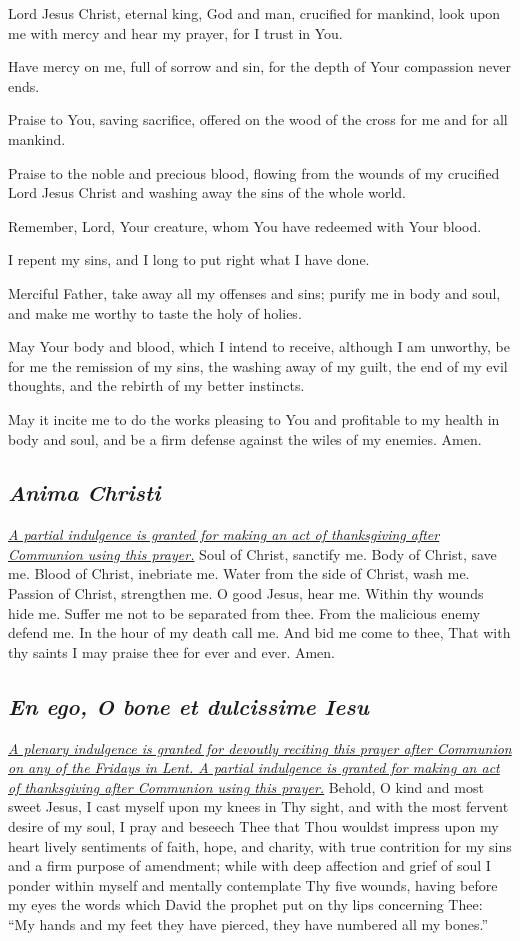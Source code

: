 \documentclass[12pt]{article}
\newcommand{\prayertitle}[1]{\subsection{#1}}
\newcommand{\indulgencedprayertitle}[1]{\prayertitle{#1 \protect\kreuz}}
\newcommand{\foreign}[1]{\textsl{#1}}
\newcommand{\note}[1]{{\small{\textsl{#1}}}\newline}
\newcommand{\linkednote}[2]{\hyperlink{#1}{\note{#2}}}
\begin{document}
Lord Jesus Christ, eternal king, God and man, crucified for mankind, look upon me with mercy and hear my prayer, for I trust in You.

Have mercy on me, full of sorrow and sin, for the depth of Your compassion never ends.

Praise to You, saving sacrifice, offered on the wood of the cross for me and for all mankind.

Praise to the noble and precious blood, flowing from the wounds of my crucified Lord Jesus Christ and washing away the sins of the whole world.

Remember, Lord, Your creature, whom You have redeemed with Your blood.

I repent my sins, and I long to put right what I have done.

Merciful Father, take away all my offenses and sins;
purify me in body and soul, and make me worthy to taste the holy of holies.

May Your body and blood, which I intend to receive, although I am unworthy, be for me the remission of my sins, the washing away of my guilt, the end of my evil thoughts, and the rebirth of my better instincts.

May it incite me to do the works pleasing to You and profitable to my health in body and soul, and be a firm defense against the wiles of my enemies.
Amen.
\newpage
\indulgencedprayertitle{\foreign{Anima Christi}}
\linkednote{grant8}{A partial indulgence is granted for making an act of thanksgiving after Communion using this prayer.}
Soul of Christ, sanctify me.
Body of Christ, save me.
Blood of Christ, inebriate me.
Water from the side of Christ, wash me.
Passion of Christ, strengthen me.
O good Jesus, hear me.
Within thy wounds hide me.
Suffer me not to be separated from thee.
From the malicious enemy defend me.
In the hour of my death call me.
And bid me come to thee,
That with thy saints I may praise thee for ever and ever.
Amen.

\indulgencedprayertitle{\foreign{En ego, O bone et dulcissime Iesu}}
\linkednote{grant8}{A plenary indulgence is granted for devoutly reciting this prayer after Communion on any of the Fridays in Lent. A partial indulgence is granted for making an act of thanksgiving after Communion using this prayer.}
Behold, O kind and most sweet Jesus, I cast myself upon my knees in Thy sight, and with the most fervent desire of my soul, I pray and beseech Thee that Thou wouldst impress upon my heart lively sentiments of faith, hope, and charity, with true contrition for my sins and a firm purpose of amendment;
while with deep affection and grief of soul I ponder within myself and mentally contemplate Thy five wounds, having before my eyes the words which David the prophet put on thy lips concerning Thee:
``My hands and my feet they have pierced, they have numbered all my bones.''
\end{document}

